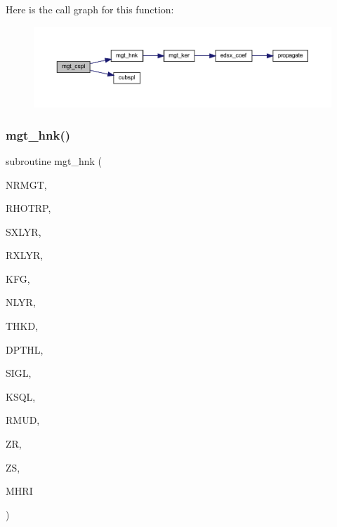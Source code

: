 Here is the call graph for this function\+:\nopagebreak
\begin{figure}[H]
\begin{center}
\leavevmode
\includegraphics[width=350pt]{Leroi__c_8f90_afd2db4ed971ee6e92ca6da7bece2caff_cgraph}
\end{center}
\end{figure}
\mbox{\label{Leroi__c_8f90_a8765868cf7e593af1ecbeadd492b6b49}} 
\subsubsection{\texorpdfstring{mgt\+\_\+hnk()}{mgt\_hnk()}}
{\footnotesize\ttfamily subroutine mgt\+\_\+hnk (\begin{DoxyParamCaption}\item[{integer}]{N\+R\+M\+GT,  }\item[{real, dimension(nrmgt)}]{R\+H\+O\+T\+RP,  }\item[{integer}]{S\+X\+L\+YR,  }\item[{integer}]{R\+X\+L\+YR,  }\item[{integer}]{K\+FG,  }\item[{integer}]{N\+L\+YR,  }\item[{real (kind=ql), dimension(nlyr)}]{T\+H\+KD,  }\item[{real (kind=ql), dimension(nlyr)}]{D\+P\+T\+HL,  }\item[{complex (kind=ql), dimension(nlyr)}]{S\+I\+GL,  }\item[{complex (kind=ql), dimension(nlyr)}]{K\+S\+QL,  }\item[{real (kind=ql), dimension(0\+:nlyr)}]{R\+M\+UD,  }\item[{real (kind=ql)}]{ZR,  }\item[{real (kind=ql)}]{ZS,  }\item[{complex (kind=ql), dimension(nrmgt,5)}]{M\+H\+RI }\end{DoxyParamCaption})}

